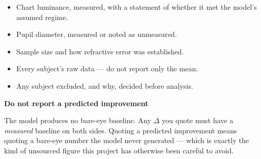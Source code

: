 \documentclass[11pt]{report}
\newenvironment{warnbox}[1]%
{\par\vspace{8pt}\begin{lrbox}{\wbsave}\begin{minipage}{0.88\textwidth}%
{\bfseries\color{warnred}#1}\par\vspace{4pt}\ignorespaces}%
{\end{minipage}\end{lrbox}%
\begin{center}\setlength{\fboxrule}{1.2pt}\setlength{\fboxsep}{8pt}%
\fcolorbox{warnred}{white}{\usebox{\wbsave}}\end{center}\vspace{8pt}\par}
\begin{document}
\begin{itemize}[leftmargin=1.2cm]
\item Chart luminance, measured, with a statement of whether it met the model's assumed regime.
\item Pupil diameter, measured or noted as unmeasured.
\item Sample size and how refractive error was established.
\item Every subject's raw data --- do not report only the mean.
\item Any subject excluded, and why, decided before analysis.
\end{itemize}

\begin{warnbox}{Do not report a predicted improvement}
The model produces no bare-eye baseline. Any $\Delta$ you quote must have a \emph{measured} baseline
on both sides. Quoting a predicted improvement means quoting a bare-eye number the model never
generated --- which is exactly the kind of unsourced figure this project has otherwise been careful
to avoid.
\end{warnbox}
\end{document}
